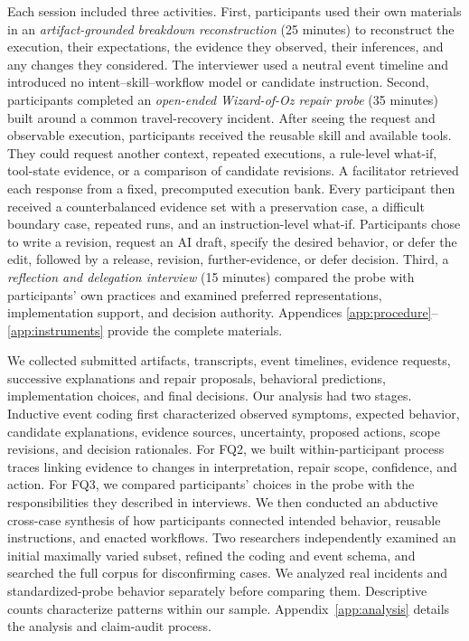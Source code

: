 Each session included three activities. First, participants used their own
materials in an \emph{artifact-grounded breakdown reconstruction} (25 minutes)
to reconstruct the execution, their expectations, the evidence they observed,
their inferences, and any changes they considered. The interviewer used a
neutral event timeline and introduced no intent--skill--workflow model or
candidate instruction. Second, participants completed an \emph{open-ended
Wizard-of-Oz repair probe} (35 minutes) built around a common travel-recovery
incident. After seeing the request and observable execution, participants
received the reusable skill and available tools. They could request another
context, repeated executions, a rule-level what-if, tool-state evidence, or a
comparison of candidate revisions. A facilitator retrieved each response from
a fixed, precomputed execution bank. Every participant then received a
counterbalanced evidence set with a preservation case, a difficult boundary
case, repeated runs, and an instruction-level what-if. Participants chose to
write a revision, request an AI draft, specify the desired behavior, or defer
the edit, followed by a release, revision, further-evidence, or defer decision.
Third, a \emph{reflection and delegation interview} (15 minutes) compared the
probe with participants' own practices and examined preferred representations,
implementation support, and decision authority. Appendices
\ref{app:procedure}--\ref{app:instruments} provide the complete materials.

We collected submitted artifacts, transcripts, event timelines, evidence
requests, successive explanations and repair proposals, behavioral
predictions, implementation choices, and final decisions. Our analysis had two
stages. Inductive event coding first characterized observed symptoms, expected
behavior, candidate explanations, evidence sources, uncertainty, proposed
actions, scope revisions, and decision rationales. For FQ2, we built
within-participant process traces linking evidence to changes in interpretation,
repair scope, confidence, and action. For FQ3, we compared participants' choices
in the probe with the responsibilities they described in interviews. We then
conducted an abductive cross-case synthesis of how participants connected
intended behavior, reusable instructions, and enacted workflows. Two
researchers independently examined an initial maximally varied subset, refined
the coding and event schema, and searched the full corpus for disconfirming
cases. We analyzed real incidents and standardized-probe behavior separately
before comparing them. Descriptive counts characterize patterns within our
sample. Appendix~\ref{app:analysis} details the analysis and claim-audit
process.

